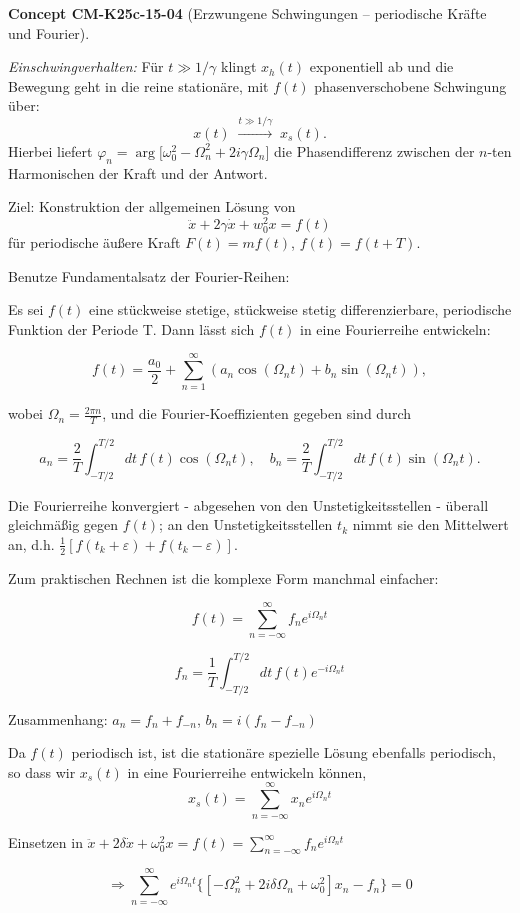 \documentclass[10pt, letterpaper]{article}
\newcommand{\CustomHeading}[3]{%
  \par\medskip\noindent%
  \textbf{#1 #2} \textnormal{(#3)}.\enskip%
}
\newenvironment{CONC}[2]{\begin{unitbox}\CustomHeading{Concept}{#1}{#2}}{\end{unitbox}}
\begin{document}
\begin{CONC}{CM-K25c-15-04}{Erzwungene Schwingungen – periodische Kräfte und Fourier}
\emph{Einschwingverhalten:}
Für \(t\gg 1/\gamma\) klingt \(x_{h}(t)\) exponentiell ab und die
Bewegung geht in die reine stationäre, mit \(f(t)\) phasenverschobene
Schwingung über:
\[
  x(t)\;\xrightarrow{t\gg1/\gamma}\;x_{s}(t).
\]
Hierbei liefert
\(\varphi_{n}=\arg\bigl[\omega_{0}^{2}-\Omega_{n}^{2}+2i\gamma\Omega_{n}\bigr]\)
die Phasendifferenz zwischen der $n$-ten Harmonischen der Kraft und der
Antwort.
\end{CONC}




Ziel: Konstruktion der allgemeinen Lösung von
\[\ddot{x} + 2\gamma\dot{x} + w_0^2x = f(t)\]
für periodische äußere Kraft $F(t) = mf(t)$, $f(t) = f(t+T)$.

Benutze Fundamentalsatz der Fourier-Reihen:

Es sei $f(t)$ eine stückweise stetige, stückweise stetig differenzierbare, periodische Funktion der Periode T. Dann lässt sich $f(t)$ in eine Fourierreihe entwickeln:

\[f(t) = \frac{a_0}{2} + \sum_{n=1}^{\infty}(a_n\cos(\Omega_n t) + b_n\sin(\Omega_n t)),\]

wobei $\Omega_n = \frac{2\pi n}{T}$, und die Fourier-Koeffizienten gegeben sind durch

\[a_n = \frac{2}{T}\int_{-T/2}^{T/2}dt\,f(t)\cos(\Omega_n t), \quad b_n = \frac{2}{T}\int_{-T/2}^{T/2}dt\,f(t)\sin(\Omega_n t).\]

Die Fourierreihe konvergiert - abgesehen von den Unstetigkeitsstellen - überall gleichmäßig gegen $f(t)$; an den Unstetigkeitsstellen $t_k$ nimmt sie den Mittelwert an, d.h. $\frac{1}{2}[f(t_k+\varepsilon) + f(t_k-\varepsilon)]$.

Zum praktischen Rechnen ist die komplexe Form manchmal einfacher:

\[f(t) = \sum_{n=-\infty}^{\infty}f_n e^{i\Omega_n t}\]

\[f_n = \frac{1}{T}\int_{-T/2}^{T/2}dt\,f(t)e^{-i\Omega_n t}\]

Zusammenhang: $a_n = f_n + f_{-n}$, $b_n = i(f_n - f_{-n})$



Da $f(t)$ periodisch ist, ist die stationäre spezielle Lösung ebenfalls periodisch, so dass wir $x_s(t)$ in eine Fourierreihe entwickeln können,
\[x_s(t)= \sum_{n=-\infty}^{\infty} x_n e^{i\Omega_n t}\]

Einsetzen in $\ddot{x}+2\delta\dot{x}+\omega_0^2x=f(t)=\sum_{n=-\infty}^{\infty}f_n e^{i\Omega_n t}$

\[\Rightarrow \sum_{n=-\infty}^{\infty} e^{i\Omega_n t}\{[-\Omega_n^2+2i\delta\Omega_n+\omega_0^2]x_n-f_n\}=0\]
\end{document}
